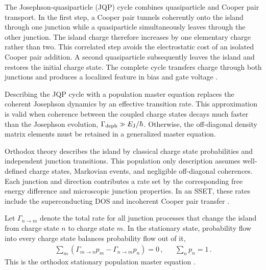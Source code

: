             The Josephson-quasiparticle (JQP) cycle combines quasiparticle and Cooper pair transport. In the first step, a Cooper pair tunnels coherently onto the island through one junction while a quasiparticle simultaneously leaves through the other junction. The island charge therefore increases by one elementary charge rather than two. This correlated step avoids the electrostatic cost of an isolated Cooper pair addition. A second quasiparticle subsequently leaves the island and restores the initial charge state. The complete cycle transfers charge through both junctions and produces a localized feature in bias and gate voltage \cite{lorenz_sset_mar_2018,lorenz_wechselspiel_2018,sprenger_interplay_2019}.

            Describing the JQP cycle with a population master equation replaces the coherent Josephson dynamics by an effective transition rate. This approximation is valid when coherence between the coupled charge states decays much faster than the Josephson evolution, $\Gamma_\mathrm{deph}\sgg E_\mathrm{J}/\hbar$. Otherwise, the off-diagonal density matrix elements must be retained in a generalized master equation.

            Orthodox theory describes the island by classical charge state probabilities and independent junction transitions. This population only description assumes well-defined charge states, Markovian events, and negligible off-diagonal coherences. Each junction and direction contributes a rate set by the corresponding free energy difference and microscopic junction properties. In an SSET, these rates include the superconducting DOS and incoherent Cooper pair transfer \cite{ingold_charge_1992,grabert_single_2013}.

            Let $\Gamma_{n\rightarrow m}$ denote the total rate for all junction processes that change the island from charge state $n$ to charge state $m$. In the stationary state, probability flow into every charge state balances probability flow out of it,
            \begin{align}
                \sum_m \left(\Gamma_{m\to n}p_m-\Gamma_{n\to m}p_n\right) = 0\,, &&
                 \sum_n p_n=1\,.
                \label{eq:stochastic:set-master-equation}
            \end{align}
            This is the orthodox stationary population master equation \cite{ingold_charge_1992,grabert_single_2013}.

